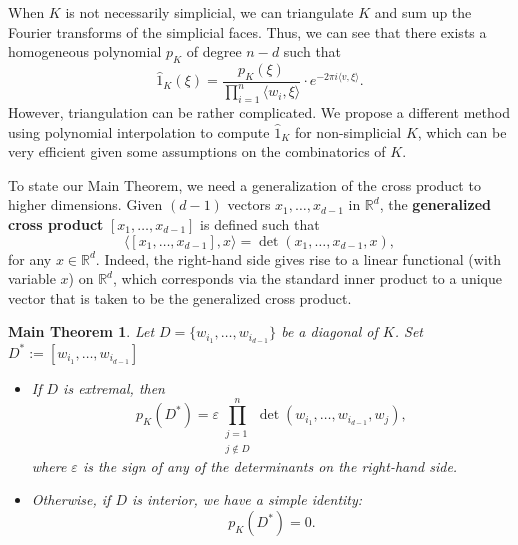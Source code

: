 \documentclass{article}
\newtheorem*{main}{Main Theorem}
\begin{document}
When $K$ is not necessarily simplicial, we can triangulate $K$ and sum up the Fourier transforms of the simplicial faces. Thus, we can see that there exists a homogeneous polynomial $p_K$ of degree $n-d$ such that
\begin{equation}\label{eqdef:pK}
	\hat{1}_K (\xi) = \frac{p_K(\xi)}{\prod_{i=1}^n \langle w_i, \xi \rangle} \cdot e^{-2 \pi i \langle v, \xi \rangle}.
\end{equation}
However, triangulation can be rather complicated. We propose a different method using polynomial interpolation to compute $\hat{1}_K$ for non-simplicial $K$, which can be very efficient given some assumptions on the combinatorics of $K$.




    To state our Main Theorem, we need a generalization of the cross product to higher dimensions. Given $(d-1)$ vectors $x_1, \dots, x_{d-1}$ in $\mathbb{R}^d$, the \textbf{generalized cross product} $[x_1, \dots, x_{d-1}]$ is defined such that
\begin{equation}\label{eqdef:gen cross}
	\langle  [x_1, \dots, x_{d-1}], x \rangle = \det(x_1, \dots, x_{d-1},x),
\end{equation}
for any $x \in \mathbb{R}^d$. Indeed, the right-hand side gives rise to a linear functional (with variable $x$) on $\mathbb{R}^d$, which corresponds via the standard inner product to a unique vector that is taken to be the generalized cross product.


\begin{main} \label{thm:MAIN}
    Let $D = \{w_{i_1}, \dots, w_{i_{d-1}}\}$ be a diagonal of $K$. Set $D^* := [w_{i_1}, \dots, w_{i_{d-1}}]$
    \begin{itemize}
    \item[(i)] If $D$ is extremal, then 
      \begin{equation}\label{eq:pK1}
          p_K (D^*) = \varepsilon \prod_{\substack{j=1 \\ j \notin D}}^n \det(w_{i_1}, \dots, w_{i_{d-1}}, w_j),
      \end{equation}
      where $\varepsilon$ is the sign of any of the determinants on the right-hand side.
    \item[(ii)] Otherwise, if $D$ is interior, we have a simple identity:
    \begin{equation}\label{eq:pK2}
    	p_K (D^*) = 0.
    \end{equation}
    \end{itemize} 
\end{main}
\end{document}
